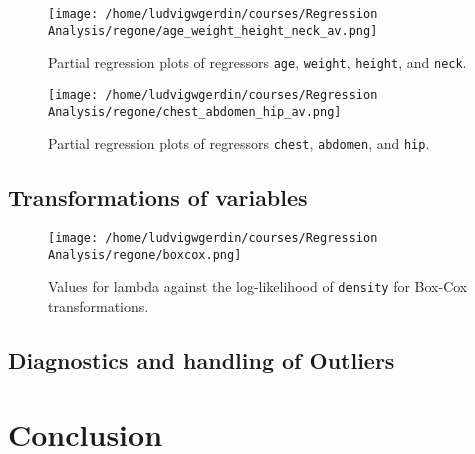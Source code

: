 \documentclass[11pt]{article}
\begin{document}
\begin{figure}[htbp]
\centering
\texttt{[image: /home/ludvigwgerdin/courses/Regression Analysis/regone/age\_weight\_height\_neck\_av.png]}
\caption{\label{fig:org8cdfcb2}
Partial regression plots of regressors \texttt{age}, \texttt{weight}, \texttt{height}, and \texttt{neck}.}
\end{figure}

\begin{figure}[htbp]
\centering
\texttt{[image: /home/ludvigwgerdin/courses/Regression Analysis/regone/chest\_abdomen\_hip\_av.png]}
\caption{\label{fig:org757b959}
Partial regression plots of regressors \texttt{chest}, \texttt{abdomen}, and \texttt{hip}.}
\end{figure}
\subsection{Transformations of variables}
\label{sec:orgc09d491}

\begin{figure}[h]
\centering
\texttt{[image: /home/ludvigwgerdin/courses/Regression Analysis/regone/boxcox.png]}
\caption{\label{fig:org564449d}
Values for lambda against the log-likelihood of \texttt{density} for Box-Cox transformations.}
\end{figure}

\subsection{Diagnostics and handling of Outliers}
\label{sec:org1b1baab}
\section{Conclusion}
\label{sec:orgc446a26}


\end{document}
